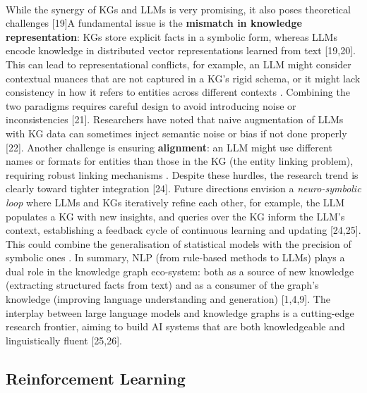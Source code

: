         \paragraph{}
        While the synergy of KGs and LLMs is very promising, it also poses theoretical challenges [19]A fundamental issue is the \textbf{mismatch in knowledge representation}: KGs store explicit facts in a symbolic form, whereas LLMs encode knowledge in distributed vector representations learned from text [19,20]. This can lead to representational conflicts, for example, an LLM might consider contextual nuances that are not captured in a KG’s rigid schema, or it might lack consistency in how it refers to entities across different contexts . Combining the two paradigms requires careful design to avoid introducing noise or inconsistencies [21]. Researchers have noted that naive augmentation of LLMs with KG data can sometimes inject semantic noise or bias if not done properly [22]. Another challenge is ensuring \textbf{alignment}: an LLM might use different names or formats for entities than those in the KG (the entity linking problem), requiring robust linking mechanisms . Despite these hurdles, the research trend is clearly toward tighter integration [24]. Future directions envision a \textit{neuro-symbolic loop} where LLMs and KGs iteratively refine each other, for example, the LLM populates a KG with new insights, and queries over the KG inform the LLM’s context, establishing a feedback cycle of continuous learning and updating [24,25]. This could combine the generalisation of statistical models with the precision of symbolic ones . In summary, NLP (from rule-based methods to LLMs) plays a dual role in the knowledge graph eco-system: both as a source of new knowledge (extracting structured facts from text) and as a consumer of the graph’s knowledge (improving language understanding and generation) [1,4,9]. The interplay between large language models and knowledge graphs is a cutting-edge research frontier, aiming to build AI systems that are both knowledgeable and linguistically fluent [25,26].
        

    \subsection{Reinforcement Learning}

